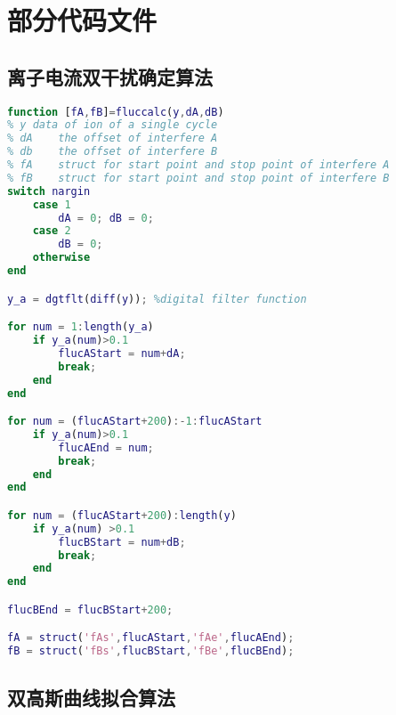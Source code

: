 \chapter{部分代码文件}
\section{离子电流双干扰确定算法}
\label{cd:dintf}
\lstset{
	basicstyle=\ttfamily\scriptsize,
	breaklines=true}
	
\begin{lstlisting}[frame=single,language=matlab]
function [fA,fB]=fluccalc(y,dA,dB)
% y	data of ion of a single cycle
% dA 	the offset of interfere A
% db 	the offset of interfere B
% fA 	struct for start point and stop point of interfere A
% fB 	struct for start point and stop point of interfere B
switch nargin
    case 1
        dA = 0; dB = 0;
    case 2
        dB = 0;
    otherwise
end

y_a = dgtflt(diff(y)); %digital filter function

for num = 1:length(y_a)
    if y_a(num)>0.1
        flucAStart = num+dA;
        break;
    end
end

for num = (flucAStart+200):-1:flucAStart
    if y_a(num)>0.1
        flucAEnd = num;
        break;
    end
end

for num = (flucAStart+200):length(y)
    if y_a(num) >0.1
        flucBStart = num+dB;
        break;
    end
end

flucBEnd = flucBStart+200;

fA = struct('fAs',flucAStart,'fAe',flucAEnd);
fB = struct('fBs',flucBStart,'fBe',flucBEnd);
\end{lstlisting}
\section{双高斯曲线拟合算法}
\label{cd:dgauss}
\lstset{
	basicstyle=\ttfamily\scriptsize,
	breaklines=true}
	
